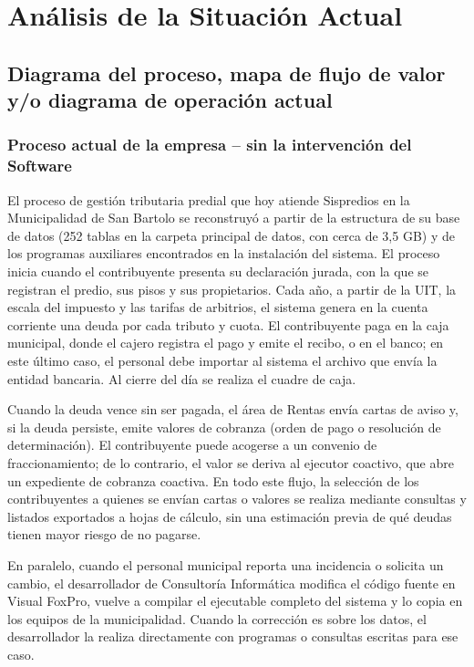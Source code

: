 \documentclass[12pt,a4paper]{report}
\begin{document}
\chapter{Análisis de la Situación Actual}

\section{Diagrama del proceso, mapa de flujo de valor y/o diagrama de operación actual}

\subsection{Proceso actual de la empresa -- sin la intervención del Software}

El proceso de gestión tributaria predial que hoy atiende Sispredios en la Municipalidad de San Bartolo se reconstruyó a partir de la estructura de su base de datos (252 tablas en la carpeta principal de datos, con cerca de 3,5 GB) y de los programas auxiliares encontrados en la instalación del sistema. %
El proceso inicia cuando el contribuyente presenta su declaración jurada, con la que se registran el predio, sus pisos y sus propietarios. Cada año, a partir de la UIT, la escala del impuesto y las tarifas de arbitrios, el sistema genera en la cuenta corriente una deuda por cada tributo y cuota. El contribuyente paga en la caja municipal, donde el cajero registra el pago y emite el recibo, o en el banco; en este último caso, el personal debe importar al sistema el archivo que envía la entidad bancaria. Al cierre del día se realiza el cuadre de caja.

Cuando la deuda vence sin ser pagada, el área de Rentas envía cartas de aviso y, si la deuda persiste, emite valores de cobranza (orden de pago o resolución de determinación). El contribuyente puede acogerse a un convenio de fraccionamiento; de lo contrario, el valor se deriva al ejecutor coactivo, que abre un expediente de cobranza coactiva. En todo este flujo, la selección de los contribuyentes a quienes se envían cartas o valores se realiza mediante consultas y listados exportados a hojas de cálculo, sin una estimación previa de qué deudas tienen mayor riesgo de no pagarse.

En paralelo, cuando el personal municipal reporta una incidencia o solicita un cambio, el desarrollador de Consultoría Informática modifica el código fuente en Visual FoxPro, vuelve a compilar el ejecutable completo del sistema y lo copia en los equipos de la municipalidad. Cuando la corrección es sobre los datos, el desarrollador la realiza directamente con programas o consultas escritas para ese caso.
\end{document}
